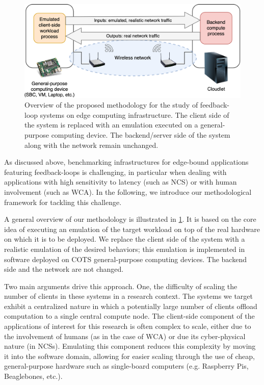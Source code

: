 \begin{figure}
    \centering
    \includegraphics[width=.8\textwidth]{Figs/methodology.png}
    \caption{%
        Overview of the proposed methodology for the study of feedback-loop systems on edge computing infrastructure.
        The  client side of the system is replaced with an emulation executed on a general-purpose computing device.
        The backend/server side of the system along with the network remain unchanged.
    }\label{fig:methodology}
\end{figure}

As discussed above, benchmarking infrastructures for edge-bound applications featuring feedback-loops is challenging, in particular when dealing with applications with high sensitivity to latency (such as \gls{NCS}) or with human involvement (such as \gls{WCA}).
In the following, we introduce our methodological framework for tackling this challenge.

A general overview of our methodology is illustrated in \cref{fig:methodology}.
It is based on the core idea of executing an emulation of the target workload on top of the real hardware on which it is to be deployed.
We replace the client side of the system with a realistic emulation of the desired behaviors; this emulation is implemented in software deployed on \gls{COTS} general-purpose computing devices.
The backend side and the network are not changed.

Two main arguments drive this approach.
One, the difficulty of scaling the number of clients in these systems in a research context.
The systems we target exhibit a centralized nature in which a potentially large number of clients offload computation to a single central compute node.
The client-side component of the applications of interest for this research is often complex to scale, either due to the involvement of humans (as in the case of \gls{WCA}) or due its cyber-physical nature (in \glspl{NCS}).
Emulating this component reduces this complexity by moving it into the software domain, allowing for easier scaling through the use of cheap, general-purpose hardware such as single-board computers (e.g. Raspberry Pis, Beaglebones, etc.).

